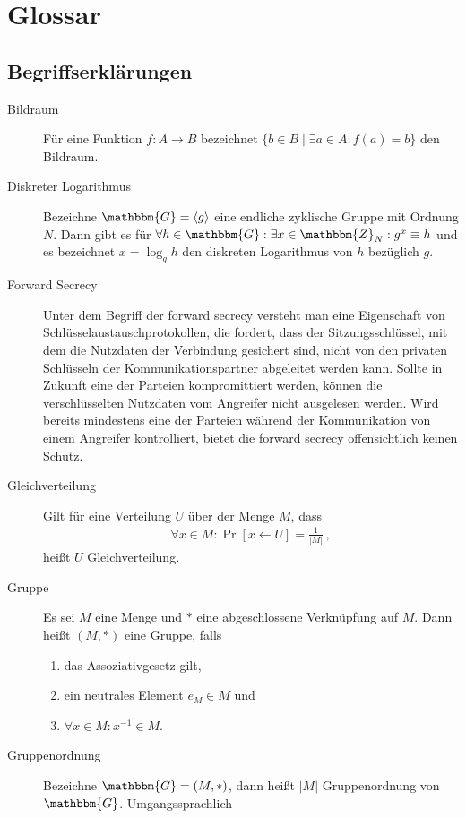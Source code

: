 \chapter{Glossar}
\section{Begriffserklärungen}
\begin{description}
	\item[Bildraum] Für eine Funktion $f\colon A \rightarrow B$ bezeichnet $\{b \in B \mid \exists a \in A: f(a) = b\}$ den Bildraum.
	\item[Diskreter Logarithmus] Bezeichne $\mathbbm{G} = \langle g \rangle$ eine endliche zyklische Gruppe mit Ordnung $N$. Dann gibt es für
	$\forall h \in \mathbbm{G} : \exists x \in \mathbbm{Z}_N :  g^x \equiv h$ und es bezeichnet $x = \log_g h$ den diskreten Logarithmus von $h$
	bezüglich $g$.
	\item[Forward Secrecy] Unter dem Begriff der forward secrecy versteht man eine Eigenschaft von Schlüsselaustauschprotokollen, die fordert,
	dass der Sitzungsschlüssel, mit dem die Nutzdaten der Verbindung gesichert sind, nicht von den privaten Schlüsseln der Kommunikationspartner
	abgeleitet werden kann. Sollte in Zukunft eine der Parteien kompromittiert werden, können die verschlüsselten Nutzdaten vom Angreifer nicht
	ausgelesen werden. Wird bereits mindestens eine der Parteien während der Kommunikation von einem Angreifer kontrolliert, bietet die forward
	secrecy offensichtlich keinen Schutz.
	\item[Gleichverteilung] Gilt für eine Verteilung $U$ über der Menge $M$, dass
	\begin{align*}
		\forall x \in M : \Pr [x \leftarrow U] = \frac{1}{\vert M \vert}\, ,
	\end{align*}
	heißt $U$ Gleichverteilung.
	\item[Gruppe] Es sei $M$ eine Menge und $\ast$ eine abgeschlossene Verknüpfung auf $M$. Dann heißt $(M, \ast)$ eine Gruppe, falls
	\begin{enumerate}
		\item das Assoziativgesetz gilt,
		\item ein neutrales Element $e_M \in M$ und
		\item $\forall x \in M : x^{-1} \in M$.
	\end{enumerate}
	\item[Gruppenordnung] Bezeichne $\mathbbm{G} = (M, \ast)$, dann heißt $\vert M \vert$ Gruppenordnung von $\mathbbm{G}$. Umgangssprachlich

\end{description}
